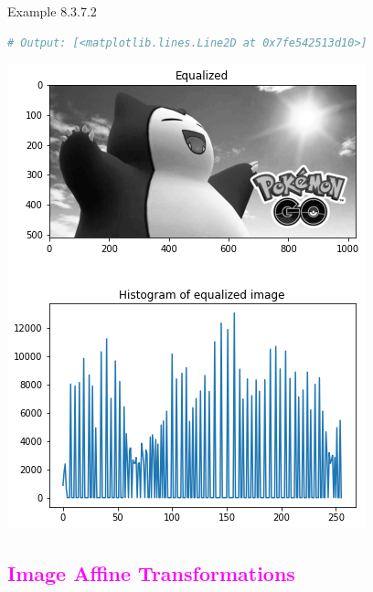 \documentclass{book}
\begin{document}
\begin{egBox}{Example 8.3.7.2}{}
\begin{lstlisting}[language=Python, basicstyle=\ttfamily\small, keywordstyle=\color{blue}, commentstyle=\color{forestgreen}, stringstyle=\color{red}, showstringspaces=false]
# Output: [<matplotlib.lines.Line2D at 0x7fe542513d10>]
    \end{lstlisting}
    \begin{center}
        \includegraphics[scale=0.42]{chapter 8/hist_equalization_opencv.png}
    \end{center}
\end{egBox}
\textcolor{magenta}{\section{\textbf{Image Affine Transformations}}}
\end{document}
